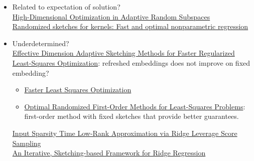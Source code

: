 \documentclass[10pt]{article}
\begin{document}
\begin{itemize}
\item
Related to expectation of solution? \\
\href{https://arxiv.org/pdf/1906.11809v1.pdf}{High-Dimensional Optimization in Adaptive Random Subspaces} \\
\href{https://projecteuclid.org/journals/annals-of-statistics/volume-45/issue-3/Randomized-sketches-for-kernels-Fast-and-optimal-nonparametric-regression/10.1214/16-AOS1472.full}{Randomized sketches for kernels: Fast and optimal nonparametric regression}

\item
Underdetermined? \\
\href{https://arxiv.org/pdf/2006.05874.pdf}{Effective Dimension Adaptive Sketching Methods for Faster Regularized Least-Squares Optimization}: refreshed embeddings does not improve on fixed embedding?
\begin{itemize}
\item
\href{https://arxiv.org/pdf/1911.02675.pdf}{Faster Least Squares Optimization}
\item
\href{https://proceedings.mlr.press/v119/lacotte20a/lacotte20a.pdf}{Optimal Randomized First-Order Methods for Least-Squares Problems}: first-order method with fixed sketches that provide better guarantees.
\end{itemize}
\href{https://arxiv.org/pdf/1511.07263.pdf}{Input Sparsity Time Low-Rank Approximation via Ridge Leverage Score Sampling} \\
\href{https://proceedings.mlr.press/v80/chowdhury18a/chowdhury18a.pdf}{An Iterative, Sketching-based Framework for Ridge Regression}

\end{itemize}



\newpage



\end{document}
